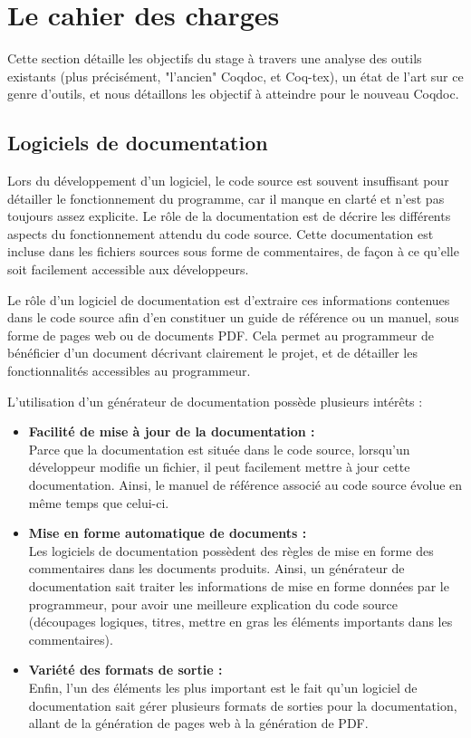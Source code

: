 \documentclass[a4paper, 11pt]{report}
\begin{document}
  \section{Le cahier des charges}
  Cette section détaille les objectifs du stage à travers une analyse des outils
  existants (plus précisément, "l'ancien" Coqdoc, et Coq-tex), un état de
  l'art sur ce genre d'outils, et nous détaillons les objectif à atteindre pour
  le nouveau Coqdoc.
    \subsection{Logiciels de documentation}
    Lors du développement d'un logiciel, le code source est souvent insuffisant
    pour détailler le fonctionnement du programme, car il manque en clarté et
    n'est pas toujours assez explicite.
    Le rôle de la documentation est de décrire les différents aspects du
    fonctionnement attendu du code source. Cette documentation est incluse
    dans les fichiers sources sous forme de commentaires, de façon à ce
    qu'elle soit facilement accessible aux développeurs.

    Le rôle d'un logiciel de documentation est d'extraire ces informations
    contenues dans le code source afin d'en constituer un guide de référence
    ou un manuel, sous forme de pages web ou de documents PDF.
    Cela permet au programmeur de bénéficier d'un document décrivant clairement
    le projet, et de détailler les fonctionnalités accessibles au programmeur.

    L'utilisation d'un générateur de documentation possède plusieurs intérêts :
    \begin{itemize}
      \item \textbf{Facilité de mise à jour de la documentation :} \\
        Parce que la documentation est située dans le code source, lorsqu'un
        développeur modifie un fichier, il peut facilement mettre à jour cette
        documentation. Ainsi, le manuel de référence associé au code source
        évolue en même temps que celui-ci.
      \item \textbf{Mise en forme automatique de documents :} \\
        Les logiciels de documentation possèdent des règles de mise en forme
        des commentaires dans les documents produits. Ainsi, un générateur
        de documentation sait traiter les informations de mise en forme
        données par le programmeur, pour avoir une meilleure explication du
        code source (découpages logiques, titres, mettre en gras les éléments
        importants dans les commentaires).
      \item \textbf{Variété des formats de sortie :} \\
        Enfin, l'un des éléments les plus important est le fait qu'un logiciel
        de documentation sait gérer plusieurs formats de sorties pour la
        documentation, allant de la génération de pages web à la génération de
        PDF.
    \end{itemize}
\end{document}
